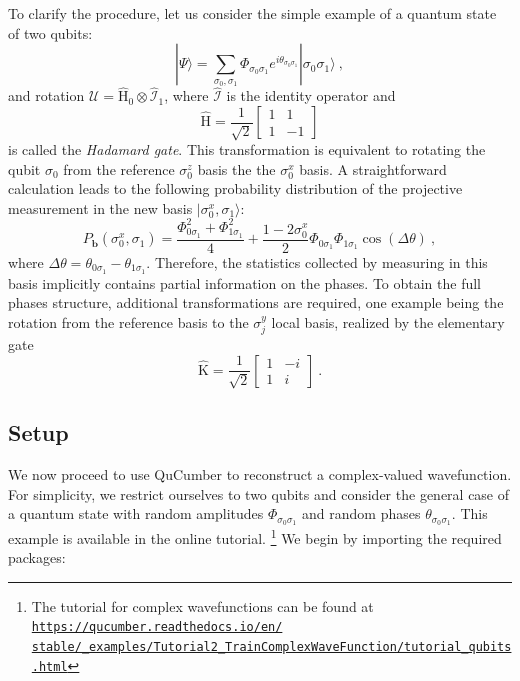 \documentclass[submission, Phys, hidelnks]{SciPost}
\begin{document}
To clarify the procedure, let us consider the simple example of a quantum state
of two qubits:
\begin{equation}
    |\Psi\rangle=\sum_{\sigma_0,\sigma_1}\Phi_{\sigma_0\sigma_1}e^{i\theta_{\sigma_0\sigma_1}}|\sigma_0\sigma_1\rangle\:,
\end{equation}
and rotation $\bm{\mathcal{U}}=\hat{\mathrm{H}}_0\otimes\hat{\mathcal{I}}_1$,
where $\hat{\mathcal{I}}$ is the identity operator and
\begin{equation}
    \hat{\mathrm{H}}=\frac{1}{\sqrt{2}}\begin{bmatrix}1 & 1\\
1 & -1
\end{bmatrix}
\end{equation}
is called the {\it Hadamard gate}. This transformation is equivalent to
rotating the qubit $\sigma_0$ from the reference $\sigma_0^z$ basis the the
$\sigma_0^x$ basis. A straightforward calculation leads to the following
probability distribution of the projective measurement in the new basis
$|\sigma_0^x,\sigma_1\rangle$:
\begin{equation}
    P_{\bm{b}}(\sigma_0^x,\sigma_1)=\frac{\Phi_{0\sigma_1}^2+\Phi_{1\sigma_1}^2}{4}+\frac{1-2\sigma_0^x}{2}\Phi_{0\sigma_1}\Phi_{1\sigma_1}\cos(\Delta\theta)\:,
\end{equation}
where $\Delta\theta=\theta_{0\sigma_1}-\theta_{1\sigma_1}$. Therefore, the
statistics collected by measuring in this basis implicitly contains partial
information on the phases. To obtain the full phases structure, additional
transformations are required, one example being the rotation from the reference
basis to the $\sigma^y_j$ local basis, realized by
the elementary gate
\begin{equation}
        \hat{\mathrm{K}}=\frac{1}{\sqrt{2}}\begin{bmatrix}1 & -i\\
    1 & i
\end{bmatrix}\:.
\end{equation}


\subsection{Setup}
We now proceed to use QuCumber to reconstruct a complex-valued wavefunction.
For simplicity, we restrict ourselves to two qubits and consider the general case
of a quantum state with random amplitudes $\Phi_{\sigma_0\sigma_1}$ and random
phases $\theta_{\sigma_0\sigma_1}$. This example is available in the online tutorial.
\footnote{The tutorial for complex wavefunctions can be found at
    \href{https://qucumber.readthedocs.io/en/stable/\_examples/Tutorial2_TrainComplexWaveFunction/tutorial_qubits.html
    }{\texttt{https://qucumber.readthedocs.io/en/\\stable/\_examples/Tutorial2\_TrainComplexWaveFunction/tutorial\_qubits.html}}
}
We begin by importing the required packages:
\end{document}
